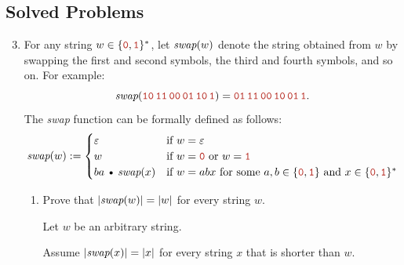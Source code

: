 \documentclass[11pt]{article}
\def\Cdot{\mathbin{\text{\normalfont \textbullet}}}
\def\Sym#1{\texttt{\color{BrickRed}#1}}
\begin{document}
\subsection*{Solved Problems}

\begin{enumerate}
\setcounter{enumi}{2}
\item
For any string $w \in \set{\Sym0,\Sym1}^*$, let $\emph{swap}(w)$ denote the string obtained from $w$ by swapping the first and second symbols, the third and fourth symbols, and so on.  For example:
\[
	\emph{swap}(\Sym{10\,11\,00\,01\,10\,1}) = \Sym{01\,11\,00\,10\,01\,1}.
\]
The \emph{swap} function can be formally defined as follows:
\[
	\emph{swap}(w) := \begin{cases}
		\e & \text{if $w=\e$}\\
		w & \text{if $w = \Sym0$ or $w = \Sym1$}\\
		ba\Cdot\emph{swap}(x) &
			\text{if $w = abx$ for some
					$a,b\in\set{\Sym0,\Sym1}$ and
					$x\in \set{\Sym0,\Sym1}^*$} 
	\end{cases}
\]

\begin{enumerate}
\item
Prove that $\mathopen| \emph{swap}(w) \mathclose| = \mathopen| w \mathclose|$ for every string $w$.

\begin{Solution}
\parindent0pt
Let $w$ be an arbitrary string.

Assume $\mathopen| \emph{swap}(x) \mathclose| = \mathopen| x \mathclose|$ for every string $x$ that is shorter than $w$.


\end{Solution}
\end{enumerate}
\end{enumerate}
\end{document}
